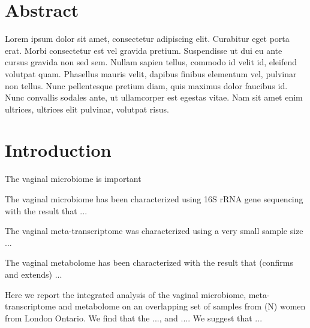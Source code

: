 \documentclass[10pt,letterpaper]{article}
\begin{document}
\section*{Abstract}
Lorem ipsum dolor sit amet, consectetur adipiscing elit. Curabitur eget porta erat. Morbi consectetur est vel gravida pretium. Suspendisse ut dui eu ante cursus gravida non sed sem. Nullam sapien tellus, commodo id velit id, eleifend volutpat quam. Phasellus mauris velit, dapibus finibus elementum vel, pulvinar non tellus. Nunc pellentesque pretium diam, quis maximus dolor faucibus id. Nunc convallis sodales ante, ut ullamcorper est egestas vitae. Nam sit amet enim ultrices, ultrices elit pulvinar, volutpat risus.



\section*{Introduction}
The vaginal microbiome is important

The vaginal microbiome has been characterized using 16S rRNA gene sequencing with the result that ...

The vaginal meta-transcriptome was characterized using a very small sample size ...

The vaginal metabolome has been characterized with the result that (confirms and extends) ...

Here we report the integrated analysis of the vaginal microbiome, meta-transcriptome and metabolome on an overlapping set of samples from (N) women from London Ontario. We find that the ..., and .... We suggest that ...


\end{document}
